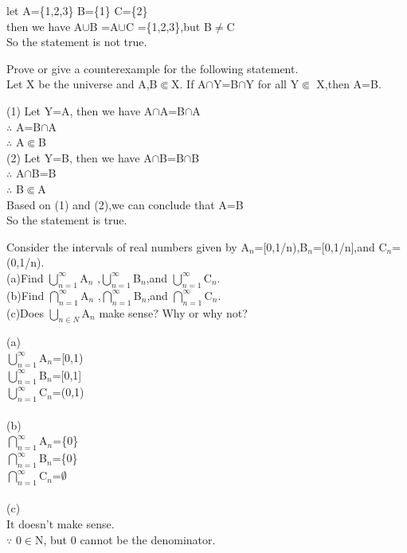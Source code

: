 \documentclass[11pt, a4paper, UTF8]{ctexart}
\begin{document}
\begin{solution}
let A=\{1,2,3\} B=\{1\} C=\{2\}\\
then we have A$\cup$B =A$\cup$C =\{1,2,3\},but B$\not=$C\\
So the statement is not true.
\end{solution}


\begin{problem}[UD:7.11]
Prove or give a counterexample for the following statement.\\
\indent Let X be the universe and A,B$\Subset$X. If A$\cap$Y=B$\cap$Y for all Y$\Subset$ X,then A=B.\\
\end{problem}

\begin{solution}
(1) Let Y=A, then we have A$\cap$A=B$\cap$A\\
$\therefore$ A=B$\cap$A\\
$\therefore$ A$\Subset$B\\
(2) Let Y=B, then we have A$\cap$B=B$\cap$B\\
$\therefore$ A$\cap$B=B\\
$\therefore$ B$\Subset$A\\
Based on (1) and (2),we can conclude that A=B\\
So the statement is true.
\end{solution}


\begin{problem}[UD:8.1]
Consider the intervals of real numbers given by A$_n$=[0,1/n),B$_n$=[0,1/n],and C$_n$=(0,1/n).\\
(a)Find $\bigcup_{n=1}^{\infty}$A$_n$ ,$\bigcup_{n=1}^{\infty}$B$_n$,and $\bigcup_{n=1}^{\infty}$C$_n$.\\
(b)Find $\bigcap_{n=1}^{\infty}$A$_n$ ,$\bigcap_{n=1}^{\infty}$B$_n$,and $\bigcap_{n=1}^{\infty}$C$_n$.\\
(c)Does $\bigcup_{n\in N}$A$_n$ make sense? Why or why not?
\end{problem}
\begin{solution}
(a)\\
$\bigcup_{n=1}^{\infty}$A$_n$=[0,1)\\
$\bigcup_{n=1}^{\infty}$B$_n$=[0,1]\\
$\bigcup_{n=1}^{\infty}$C$_n$=(0,1)\\
\\
(b)\\
$\bigcap_{n=1}^{\infty}$A$_n$=\{0\}\\
$\bigcap_{n=1}^{\infty}$B$_n$=\{0\}\\
$\bigcap_{n=1}^{\infty}$C$_n$=$\emptyset$\\
\\
(c)\\
It doesn't make sense.\\
$\because$ 0$\in$N, but 0 cannot be the denominator.\\

\end{solution}
\end{document}
